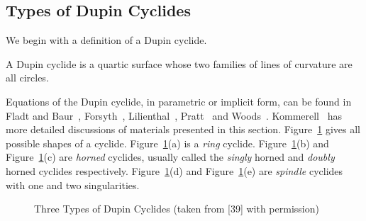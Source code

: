
\subsection{Types of Dupin Cyclides}
\label{section:type-cyclide}

     We begin with a definition of a Dupin cyclide.

\begin{definition}
     A Dupin cyclide is a quartic surface whose two families of lines of 
curvature are all circles.  
\end{definition}

     Equations of the Dupin cyclide, in parametric or implicit form, can be found 
in Fladt and Baur~\cite{fladt-baur:1975}, 
Forsyth~\cite{forsyth:1912},
Lilienthal~\cite{lilienthal:1913}, 
Pratt~\cite{pratt:1990} and
Woods~\cite{woods:1922}.  
Kommerell~\cite{kommerell:1918} has more detailed
discussions of materials presented in this section.
Figure~\ref{fig:cyclides} gives
all possible shapes of a cyclide.
Figure~\ref{fig:cyclides}(a) is a {\em ring} cyclide.
Figure~\ref{fig:cyclides}(b) and Figure~\ref{fig:cyclides}(c) are
{\em horned} cyclides, 
usually called the {\em singly} horned
 and
{\em doubly} horned cyclides
 respectively.
Figure~\ref{fig:cyclides}(d) and Figure~\ref{fig:cyclides}(e)
are {\em spindle} cyclides
 with one and two singularities.  
\begin{figure}
\vspace{18.5cm}
\caption{Three Types of Dupin Cyclides (taken from [39] with permission)}
\label{fig:cyclides}
\end{figure}

